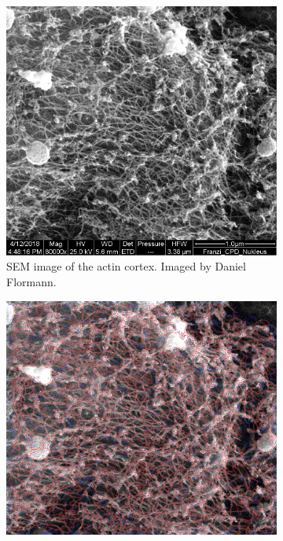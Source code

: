 \documentclass[12pt,english,twocolumn]{revtex4}
\begin{document}
\begin{figure}[t]
    \centering
    \begin{subfigure}[b]{.48\linewidth}
        \includegraphics[width=\linewidth]{figures/og_image.png}
        \caption{SEM image of the actin cortex. Imaged by Daniel Flormann.\vspace*{1.85\baselineskip}}
        \label{subfig:og_for_old}
    \end{subfigure}\hspace{.02\linewidth}%
    \begin{subfigure}[b]{.48\linewidth}
        \includegraphics[width=\linewidth]{figures/new_trace_og.png}

\end{subfigure}
\end{figure}
\end{document}
